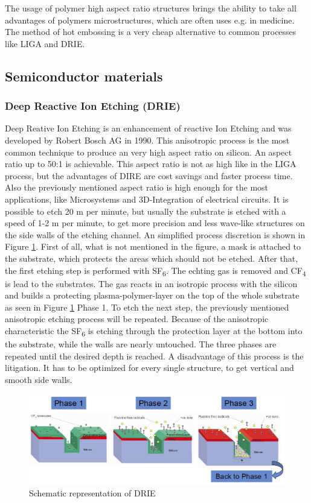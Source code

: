 \documentclass[a4paper,
  twoside, %
  headlines=2.1 %
  ]{scrartcl}
\begin{document}
The usage of polymer high aspect ratio structures brings the ability to take all advantages of polymers microstructures, which are often uses e.g. in medicine. The method of hot embossing is a very cheap alternative to common processes like LIGA and DRIE.

\subsection{Semiconductor materials}
\subsubsection{Deep Reactive Ion Etching (DRIE)}\label{DRIE}
Deep Reative Ion Etching is an enhancement of reactive Ion Etching and was developed by Robert Bosch AG in 1990. This anisotropic process is the most common technique to produce an very high aspect ratio on silicon. An aspect ratio up to 50:1 is achievable. This aspect ratio is not as high like in the LIGA process, but the advantages of DIRE are cost savings and faster process time. Also the previously mentioned aspect ratio is high enough for the most applications, like  Microsystems and 3D-Integration of electrical circuits. It is possible to etch 20 \textmu m per minute, but usually the substrate is etched with a speed of 1-2 \textmu m per minute, to get more precision and less wave-like structures on the side walls of the etching channel\cite{wikiDRIE}. An simplified process discretion is shown in Figure \ref{Schematic_drie}. First of all, what is not mentioned in the figure, a mask is attached to the substrate, which protects the areas which should not be etched. After that, the first etching step is performed with SF\textsubscript{6}. The echting gas is removed and CF\textsubscript{4} is lead to the substrates. The gas reacts in an isotropic process with the silicon and builds a protecting plasma-polymer-layer on the top of the whole substrate as seen in Figure \ref{Schematic_drie} Phase 1. To etch the next step, the previously mentioned anisotropic etching process will be repeated. Because of the anisotropic characteristic the SF\textsubscript{6} is etching through the protection layer at the bottom into the substrate, while the walls are nearly untouched. The three phases are repeated until the desired depth is reached. A disadvantage of this process is the litigation. It has to be optimized for every single structure, to get vertical and smooth side walls\cite{menz2005paul}.

\begin{figure}[H]
	\centering
	\includegraphics[width=\textwidth]{Graphics/DIRE/drie-schema_fraunhofer.jpg}
	\caption{Schematic representation of DRIE \cite{Fraunhofer2019}}
	\centering
	\label{Schematic_drie}
\end{figure} 
\end{document}

